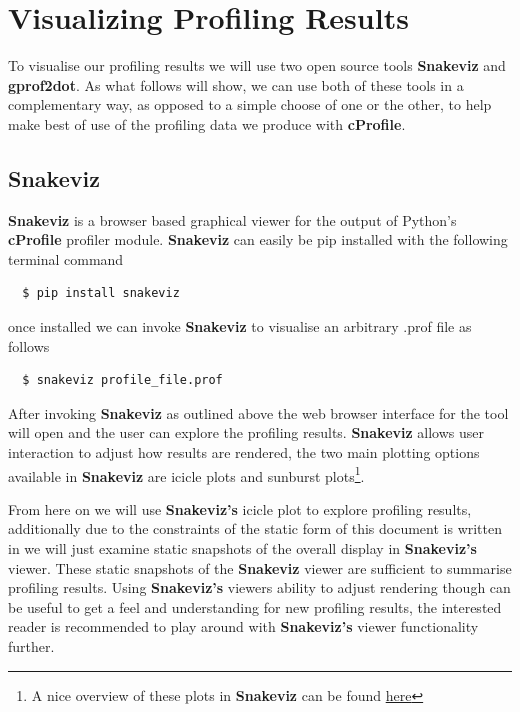 \section{Visualizing Profiling Results}

To visualise our profiling results we will use two open source tools \textbf{Snakeviz} and \textbf{gprof2dot}. As what follows will show, we can use both of these tools in a complementary way, as opposed to a simple choose of one or the other, to help make best of use of the profiling data we produce with \textbf{cProfile}.

\subsection{Snakeviz}\label{snakeviz}
\textbf{Snakeviz}\cite{snakeviz} is a browser based graphical viewer for the output of Python's \textbf{cProfile} profiler module. \textbf{Snakeviz} can easily be pip installed with the following terminal command

\begin{verbatim}
  $ pip install snakeviz
\end{verbatim}

once installed we can invoke \textbf{Snakeviz} to visualise an arbitrary .prof file as follows

\begin{verbatim}
  $ snakeviz profile_file.prof
\end{verbatim}

After invoking \textbf{Snakeviz} as outlined above the web browser interface for the tool will open and the user can explore the profiling results. \textbf{Snakeviz} allows user interaction to adjust how results are rendered, the two main plotting options available in \textbf{Snakeviz} are icicle plots and sunburst plots\footnote{A nice overview of these plots in \textbf{Snakeviz} can be found \href{https://www.machinelearningplus.com/python/cprofile-how-to-profile-your-python-code/}{here}}. 

From here on we will use \textbf{Snakeviz's} icicle plot to explore profiling results, additionally due to the constraints of the static form of this document is written in we will just examine static snapshots of the overall display in \textbf{Snakeviz's} viewer. These static snapshots of the \textbf{Snakeviz} viewer are sufficient to summarise profiling results. Using \textbf{Snakeviz's} viewers ability to adjust rendering though can be useful to get a feel and understanding for new profiling results, the interested reader is recommended to play around with \textbf{Snakeviz's} viewer functionality further.

